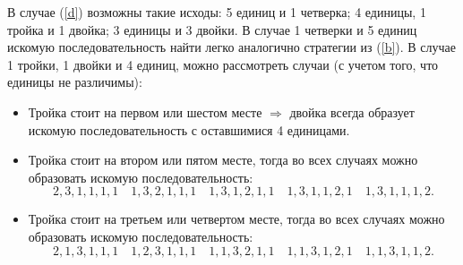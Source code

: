 \documentclass{article}
\begin{document}
\begin{enumerate}
        В случае (\ref{d}) возможны такие исходы: 5 единиц и 1 четверка; 4 единицы, 1 тройка и 1 двойка; 3 единицы и 3 двойки. В случае 1 четверки и 5 единиц искомую последовательность найти легко аналогично стратегии из (\ref{b}). В случае 1 тройки, 1 двойки и 4 единиц, можно рассмотреть случаи (с учетом того, что единицы не различимы):
        \begin{itemize}
            \item Тройка стоит на первом или шестом месте $\Rightarrow$ двойка всегда образует искомую последовательность с оставшимися 4 единицами.
            \item Тройка стоит на втором или пятом месте, тогда во всех случаях можно образовать искомую последовательность:
            \begin{equation}
                2,3,1,1,1,1 \quad 1,3,2,1,1,1 \quad 1,3,1,2,1,1 \quad 1,3,1,1,2,1 \quad 1,3,1,1,1,2.
            \end{equation}
            \item Тройка стоит на третьем или четвертом месте, тогда во всех случаях можно образовать искомую последовательность:
            \begin{equation}
                2,1,3,1,1,1 \quad 1,2,3,1,1,1 \quad 1,1,3,2,1,1 \quad 1,1,3,1,2,1 \quad 1,1,3,1,1,2.
            \end{equation}
        \end{itemize}


\end{enumerate}
\end{document}
